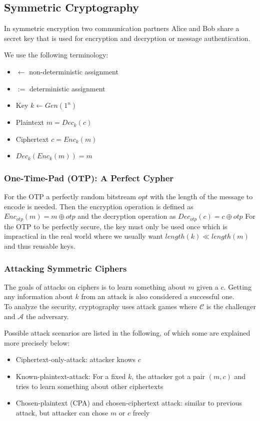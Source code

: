 \subsection{Symmetric Cryptography}
In symmetric encryption two communication partners Alice and Bob share a secret key that is used for encryption and decryption or message authentication.

We use the following terminology:
\begin{itemize}[noitemsep, topsep=0pt]
  \item $\leftarrow$ non-deterministic assignment
  \item $:=$ deterministic assignment
  \item Key $k \leftarrow Gen(1^n)$
  \item Plaintext $m = Dec_k(c)$
  \item Ciphertext $c = Enc_k(m)$
  \item $Dec_k(Enc_k(m)) = m$
\end{itemize}

\subsubsection{One-Time-Pad (OTP): A Perfect Cypher}
For the OTP a perfectly random bitstream $opt$ with the length of the message to encode is needed.
Then the encryption operation is defined as $Enc_{otp}(m) = m \oplus otp$ and the decryption operation as $Dec_{otp}(c) = c \oplus otp$
For the OTP to be perfectly secure, the key must only be used once which is impractical in the real world where we usually want $length(k) \ll length(m)$ and thus reusable keys.

\subsubsection{Attacking Symmetric Ciphers}
The goals of attacks on ciphers is to learn something about $m$ given a $c$.
Getting any information about $k$ from an attack is also considered a successful one.\\

To analyze the security, cryptography uses attack games where $\mathcal{C}$ is the challenger and $\mathcal{A}$ the adversary.

Possible attack scenarios are listed in the following, of which some are explained more precisely below:
\begin{itemize}[noitemsep, topsep=0pt]
  \item Ciphertext-only-attack: attacker knows $c$
  \item Known-plaintext-attack: For a fixed $k$, the attacker got a pair $(m, c)$ and tries to learn something about other ciphertexts
  \item Chosen-plaintext (CPA) and chosen-ciphertext attack: similar to previous attack, but attacker can chose $m$ or $c$ freely
\end{itemize}
\vspace{10pt}

